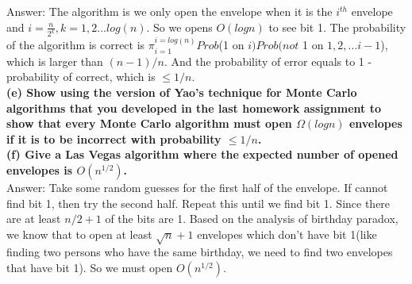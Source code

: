 \documentclass{article}
\begin{document}
Answer: The algorithm is we only open the envelope when it is the $i^{th}$ envelope and $i = \frac{n}{2^k}, k = 1, 2 ... log(n)$. So we opens $O(logn)$ to see bit 1. The probability of the algorithm is correct is $\pi_{i=1}^{i=log(n)}Prob$(1 on $i)Prob(not$ 1 on $1, 2, ... i-1$), which is larger than $(n-1)/n$. And the probability of error equals to 1 - probability of correct, which is $\leq 1/n$. \\\newline
\textbf{(e) Show using the version of Yao’s technique for Monte Carlo algorithms that you developed in the last homework assignment to show that every Monte Carlo algorithm must open $\Omega(logn)$ envelopes if it is to be incorrect with probability $\leq 1/n$.} \\ \newline
\textbf{(f) Give a Las Vegas algorithm where the expected number of opened envelopes is $O(n^{1/2})$.}\\ \newline
Answer: Take some random guesses for the first half of the envelope. If cannot find bit 1, then try the second half. Repeat this until we find bit 1. Since there are at least $n/2 + 1$ of the bits are 1. Based on the analysis of birthday paradox, we know that to open at least $\sqrt{n} + 1$ envelopes which don't have bit 1(like finding two persons who have the same birthday, we need to find two envelopes that have bit 1). So we must open  $O(n^{1/2})$.
\end{document}
